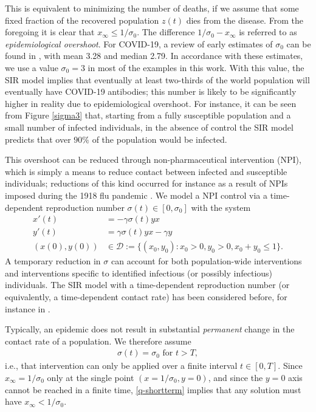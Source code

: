 \documentclass[english,12pt,letter]{article}
\newcommand{\Rnot}{\sigma_0}
\newcommand{\Sinf}{x_\infty}
\newcommand{\dom}{{\mathcal D}}
\begin{document}
This is equivalent to minimizing the number of deaths, if we assume that
some fixed fraction of the recovered population $z(t)$ dies from the disease.
From the foregoing it is clear that $\Sinf \le 1/\Rnot$.  The difference
$1/\Rnot-\Sinf$ is referred to as {\em epidemiological overshoot}.
For COVID-19, a review of early estimates of $\Rnot$ can be found in
\cite[Table 1]{liu2020reproductive}, with mean 3.28 and median 2.79.
In accordance with these estimates, we use a value $\Rnot=3$ in most of
the examples in this work.  With this value, the SIR model implies that eventually
at least two-thirds of the world population will eventually have COVID-19 antibodies;
this number is likely to be significantly higher in reality due to epidemiological
overshoot.  For instance, it can be seen from Figure \ref{sigma3} that, starting
from a fully susceptible population and a small number of infected individuals,
in the absence of control the SIR model predicts that over $90\%$ of the population
would be infected.

This overshoot can be reduced through non-pharmaceutical intervention (NPI),
which is simply a means to reduce contact between infected and susceptible
individuals; reductions of this kind occurred for instance as a result
of NPIs imposed during the 1918 flu pandemic \cite{bootsma2007effect}.  We model a NPI
control via a time-dependent reproduction number $\sigma(t)\in[0,\Rnot]$ with the system
\begin{subequations} \label{SIRq}
\begin{align}
    x'(t) & = -\gamma \sigma(t) y x \\
    y'(t) & = \gamma \sigma(t) y x - \gamma y \\
    (x(0),y(0)) & \in \dom := \{(x_0,y_0) : x_0 > 0, y_0 > 0, x_0+y_0 \le 1\}.
\end{align}
\end{subequations}
A temporary reduction in $\sigma$ can account for both
population-wide interventions and interventions specific to identified infectious
(or possibly infectious) individuals.  The SIR model with a time-dependent
reproduction number (or equivalently, a time-dependent contact rate) has been 
considered before, for instance in \cite{bootsma2007effect,sun2020tracking}.

Typically, an epidemic does not result in substantial {\em permanent} change in the contact rate of
a population.  We therefore assume 
\begin{align} \label{q-shortterm}
    \sigma(t)=\Rnot \text{ for } t>T,
\end{align}
i.e., that intervention can only be applied over a finite interval $t \in [0,T]$.
Since $x_\infty=1/\sigma_0$ only at the single point $(x=1/\sigma_0,y=0)$, and since 
the $y=0$ axis cannot be reached in a finite time, \eqref{q-shortterm} implies
that any solution must have $x_\infty<1/\sigma_0$.
\end{document}
